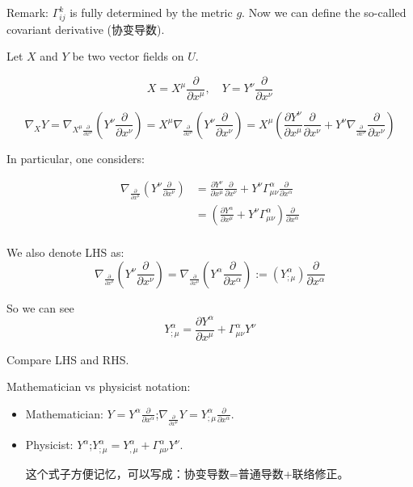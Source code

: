 Remark: $\Gamma_{ij}^k$ is fully determined by the metric $g$. Now we can define the so-called covariant derivative (协变导数).


Let $X$ and $Y$ be two vector fields on $U$.

\[
X = X^\mu \frac{\partial}{\partial x^\mu}, \quad Y = Y^\nu \frac{\partial}{\partial x^\nu}
\]

\[
\nabla_X Y = \nabla_{X^\mu \frac{\partial}{\partial x^\mu}} \left( Y^\nu \frac{\partial}{\partial x^\nu} \right) = X^\mu \nabla_{\frac{\partial}{\partial x^\mu}} \left( Y^\nu \frac{\partial}{\partial x^\nu} \right) =X^\mu \left( \frac{\partial Y^\nu}{\partial x^\mu} \frac{\partial}{\partial x^\nu} + Y^\nu \nabla_{\frac{\partial}{\partial x^\mu}} \frac{\partial}{\partial x^\nu} \right)
\]



In particular, one considers:





\begin{equation*}
    \begin{aligned}
    \nabla_{\frac{\partial}{\partial x^\mu}} \left( Y^\nu \frac{\partial}{\partial x^\nu} \right) &= \frac{\partial Y^\nu}{\partial x^\mu} \frac{\partial}{\partial x^\nu} + Y^\nu \Gamma_{\mu\nu}^\alpha \frac{\partial}{\partial x^\alpha}\\
        &= \left( \frac{\partial Y^\alpha}{\partial x^\mu} + Y^\nu \Gamma_{\mu\nu}^\alpha \right) \frac{\partial}{\partial x^\alpha}\\
    \end{aligned}
\end{equation*}

We also denote LHS as:
\[\nabla_{\frac{\partial}{\partial x^\mu}} \left( Y^\nu \frac{\partial}{\partial x^\nu} \right)=\nabla_{\frac{\partial}{\partial x^\mu}} \left( Y^\alpha \frac{\partial}{\partial x^\alpha} \right):=(Y^\alpha_{;\mu})\frac{\partial}{\partial x^\alpha}\]


So we can see 
\[
Y^\alpha_{;\mu} = \frac{\partial Y^\alpha}{\partial x^\mu} + \Gamma_{\mu\nu}^\alpha Y^\nu
\]

Compare LHS and RHS.

\begin{remark}
Mathematician vs physicist notation:
\begin{itemize}
    \item Mathematician: $Y = Y^\alpha \frac{\partial}{\partial x^\alpha}$;\quad $\nabla_{\frac{\partial}{\partial x^\mu}} Y = Y^\alpha_{;\mu} \frac{\partial}{\partial x^\alpha}$.
    \item Physicist:  $Y^\alpha$;\quad $Y^\alpha_{;\mu} =Y^\alpha_{,\mu}+\Gamma_{\mu\nu}^\alpha Y^\nu.$

这个式子方便记忆，可以写成：协变导数=普通导数+联络修正。
\end{itemize}
\end{remark}

